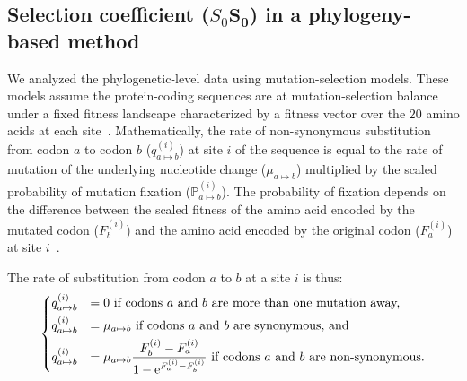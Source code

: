 \documentclass[10pt,letterpaper]{article}
\newcommand{\e}{\text{e}}
\newcommand{\proba}{\mathbb{P}}
\newcommand{\Sphy}{S_{0}}
\providecommand{\DIFdeltex}[1]{{\protect\color{red}\sout{#1}}}                      %
\providecommand{\DIFaddbegin}{} %
\providecommand{\DIFaddend}{} %
\providecommand{\DIFdelbegin}{} %
\providecommand{\DIFdelend}{} %
\providecommand{\DIFdel}[1]{\texorpdfstring{\DIFdeltex{#1}}{}} %
\newcommand{\DIFscaledelfig}{0.5}
\newlength{\DIFdelgraphicswidth} %
\newlength{\DIFdelgraphicsheight} %
\newcommand{\DIFaddincludegraphics}[2][]{{\color{blue}\fbox{\DIFOincludegraphics[#1]{#2}}}} %
\newcommand{\DIFdelincludegraphics}[2][]{%
\sbox{\DIFdelgraphicsbox}{\DIFOincludegraphics[#1]{#2}}%
\settoboxwidth{\DIFdelgraphicswidth}{\DIFdelgraphicsbox} %
\settoboxtotalheight{\DIFdelgraphicsheight}{\DIFdelgraphicsbox} %
\scalebox{\DIFscaledelfig}{%
\parbox[b]{\DIFdelgraphicswidth}{\usebox{\DIFdelgraphicsbox}\\[-\baselineskip] \rule{\DIFdelgraphicswidth}{0em}}\llap{\resizebox{\DIFdelgraphicswidth}{\DIFdelgraphicsheight}{%
\setlength{\unitlength}{\DIFdelgraphicswidth}%
\begin{picture}(1,1)%
\thicklines\linethickness{2pt} %
{\color[rgb]{1,0,0}\put(0,0){\framebox(1,1){}}}%
{\color[rgb]{1,0,0}\put(0,0){\line( 1,1){1}}}%
{\color[rgb]{1,0,0}\put(0,1){\line(1,-1){1}}}%
\end{picture}%
}\hspace*{3pt}}} %
} %
\DeclareRobustCommand{\DIFaddbegin}{\DIFOaddbegin \let\includegraphics\DIFaddincludegraphics} %
\DeclareRobustCommand{\DIFaddend}{\DIFOaddend \let\includegraphics\DIFOincludegraphics} %
\DeclareRobustCommand{\DIFdelbegin}{\DIFOdelbegin \let\includegraphics\DIFdelincludegraphics} %
\DeclareRobustCommand{\DIFdelend}{\DIFOaddend \let\includegraphics\DIFOincludegraphics} %
\begin{document}
\subsection{Selection coefficient (\DIFdelbegin \DIFdel{$\Sphy$}\DIFdelend \DIFaddbegin \texorpdfstring{$\bm{\Sphy}$}{S₀}\DIFaddend ) in a phylogeny-based method}
\label{subsec:s-phylogeny-method}

We analyzed the phylogenetic-level data using mutation-selection models.
These models assume the protein-coding sequences are at mutation-selection balance under a fixed fitness landscape characterized by a fitness vector over the $20$ amino acids at each site~\cite{yang_mutationselection_2008, halpern_evolutionary_1998, rodrigue_mechanistic_2010}.
Mathematically, the rate of non-synonymous substitution from codon $a$ to codon $b$ ($q_{a \mapsto b}^{(i)}$) at site $i$ of the sequence is equal to the rate of mutation of the underlying nucleotide change ($\mu_{a \mapsto b}$) multiplied by the scaled probability of mutation fixation ($\proba_{a \mapsto b}^{(i)}$).
The probability of fixation depends on the difference between the scaled fitness of the amino acid encoded by the mutated codon ($F_b^{(i)}$) and the amino acid encoded by the original codon ($F_a^{(i)}$) at site $i$~\cite{wright_evolution_1931, fisher_genetical_1930}.

The rate of substitution from codon $a$ to $b$ at a site $i$ is thus:
\begin{equation}
\begin{dcases}
q_{a \mapsto b}^{(i)} & = 0 \text{ if codons $a$ and $b$ are more than one mutation away,} \\
q_{a \mapsto b}^{(i)} & = \mu_{a \mapsto b} \text{ if codons $a$ and $b$ are synonymous, and}\\
q_{a \mapsto b}^{(i)} & = \mu_{a \mapsto b} \dfrac{F_b^{(i)} - F_a^{(i)}}{1 - \e^{F_a^{(i)} - F_b^{(i)}}} \text{ if codons $a$ and $b$ are non-synonymous}.
\end{dcases}
\end{equation}
\end{document}
